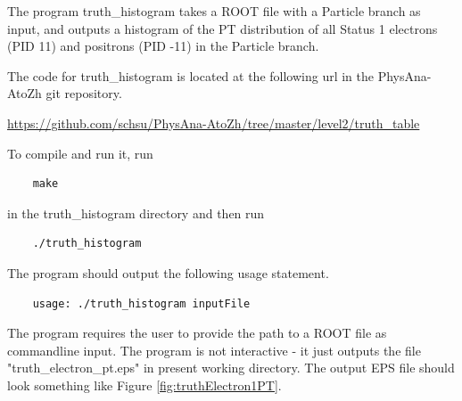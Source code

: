 \documentclass{article}
\begin{document}
The program truth\_histogram takes a ROOT file with a Particle branch as input, and outputs a histogram
of the PT distribution of all Status 1 electrons (PID 11) and positrons (PID -11) in the Particle branch.

\bigskip

The code for truth\_histogram is located at the following url in the PhysAna-AtoZh git repository.

\bigskip

\url{https://github.com/schsu/PhysAna-AtoZh/tree/master/level2/truth_table}

\bigskip

To compile and run it, run

\begin{verbatim}
	make
\end{verbatim} 

in the truth\_histogram directory and then run

\begin{verbatim}
	./truth_histogram
\end{verbatim}

The program should output the following usage statement.

\begin{verbatim}
	usage: ./truth_histogram inputFile
\end{verbatim}

The program requires the user to provide the path to a ROOT file as commandline input.
The program is not interactive - it just outputs the file "truth\_electron\_pt.eps" in
present working directory. The output EPS file should look something like Figure \ref{fig:truthElectron1PT}.
\end{document}
